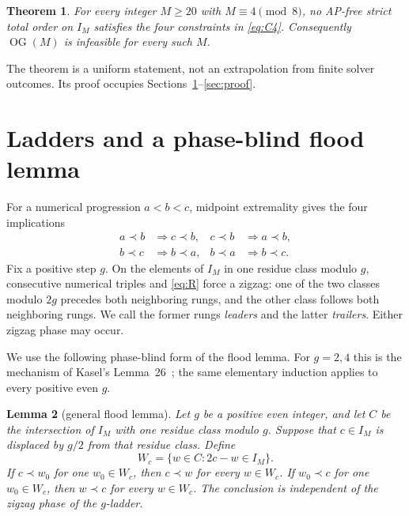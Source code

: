 \documentclass[11pt]{article}
\newtheorem{theorem}{Theorem}
\newtheorem{lemma}[theorem]{Lemma}
\newcommand{\IM}{I_M}
\newcommand{\OG}{\operatorname{OG}}
\begin{document}
\begin{theorem}\label{thm:main}
For every integer $M\geq20$ with $M\equiv4\pmod8$, no AP-free strict total
order on $\IM$ satisfies the four constraints in \eqref{eq:C4}.  Consequently
$\OG(M)$ is infeasible for every such $M$.
\end{theorem}

The theorem is a uniform statement, not an extrapolation from finite solver
outcomes.  Its proof occupies Sections~\ref{sec:tools}--\ref{sec:proof}.

\section{Ladders and a phase-blind flood lemma}\label{sec:tools}

For a numerical progression $a<b<c$, midpoint extremality gives the four
implications
\begin{equation}\label{eq:R}
\begin{aligned}
 a\prec b&\Longrightarrow c\prec b, &
 c\prec b&\Longrightarrow a\prec b,\\
 b\prec c&\Longrightarrow b\prec a, &
 b\prec a&\Longrightarrow b\prec c.
\end{aligned}
\end{equation}
Fix a positive step $g$.  On the elements of $\IM$ in one residue class
modulo $g$, consecutive numerical triples and \eqref{eq:R} force a zigzag:
one of the two classes modulo $2g$ precedes both neighboring rungs, and the
other class follows both neighboring rungs.  We call the former rungs
\emph{leaders} and the latter \emph{trailers}.  Either zigzag phase may occur.

We use the following phase-blind form of the flood lemma.  For $g=2,4$ this
is the mechanism of Kasel's Lemma~26~\cite{Kasel2026}; the same elementary
induction applies to every positive even $g$.

\begin{lemma}[general flood lemma]\label{lem:flood}
Let $g$ be a positive even integer, and let $C$ be the intersection of
$\IM$ with one residue class modulo $g$.  Suppose that $c\in\IM$ is displaced
by $g/2$ from that residue class.  Define
\[
 W_c=\{w\in C:2c-w\in\IM\}.
\]
If $c\prec w_0$ for one $w_0\in W_c$, then $c\prec w$ for every $w\in W_c$.
If $w_0\prec c$ for one $w_0\in W_c$, then $w\prec c$ for every $w\in W_c$.
The conclusion is independent of the zigzag phase of the $g$-ladder.
\end{lemma}
\end{document}
